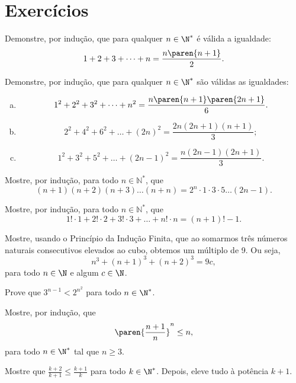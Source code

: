 \section{Exercícios}

\begin{exercise}
Demonstre, por indução, que para qualquer $n \in \N^*$ é válida a igualdade:
$$1+2+ 3+ \dots + n = \frac{n \paren {n+1}} 2.$$
\end{exercise}

\begin{exercise}
Demonstre, por indução, que para qualquer $n \in \N^*$ são válidas as igualdades:
\begin{enumerate}[a)]
	\item $$1^2 +2^2 + 3^2+ \dots + n^2 = \frac{n \paren {n+1} \paren{2n+1}} 6.$$
	\item $$2^2 + 4^2 + 6^2 + \dots + (2n)^2 = \dfrac{2n(2n+1)(n+1)}{3};$$
	\item $$1^2 + 3^2 + 5^2 + \dots + (2n-1)^2 = \frac{n(2n-1)(2n+1)}{3}.$$
\end{enumerate}
\end{exercise}

\begin{exercise}
	Mostre, por indução, para todo $n \in \mathbb N^\ast $, que 
	$$(n+1)(n+2)(n+3) \dots (n+n) = 2^n \cdot 1 \cdot 3 \cdot 5 \dots (2n-1) .$$
\end{exercise}

\begin{exercise}
	Mostre, por indução, para todo $n \in \mathbb N^\ast $, que
	$$1!\cdot 1 + 2! \cdot 2 + 3! \cdot 3 + \dots + n! \cdot n = (n+1)! - 1.$$
\end{exercise}

\begin{exercise}
	Mostre, usando o Princípio da Indução Finita, que ao somarmos três números naturais consecutivos elevados ao cubo, obtemos um múltiplo de 9. Ou seja,
	$$n^3 + (n+1)^3 + (n+2)^3 = 9c,$$
para todo $n \in \N $ e algum $c \in \N$.
\end{exercise}

\begin{exercise}
Prove que $3^{n-1} < 2^{n^2}$ para todo $n \in \N^*$.
\end{exercise}

\begin{exercise}
Mostre, por indução, que
$$\paren{\frac {n+1}{n}}^n \leq n,$$
para todo $n \in \N^*$ tal que $n \geq 3$.

\begin{hint}
Mostre que $\frac{k+2}{k+1} \leq \frac{k+1} k$ para todo $k \in
\N^*$. Depois, eleve tudo à potência $k+1$.
\end{hint}
\end{exercise}

